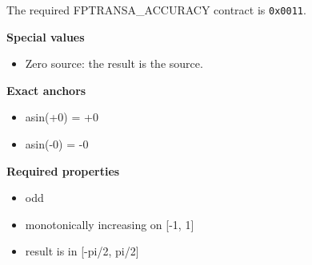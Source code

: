 The required FPTRANSA\_ACCURACY contract is \texttt{0x0011}.

\textbf{Special values}\par
\begin{itemize}
\item Zero source: the result is the source.
\end{itemize}

\textbf{Exact anchors}\par
\begin{itemize}
\item asin(+0) = +0
\item asin(-0) = -0
\end{itemize}

\textbf{Required properties}\par
\begin{itemize}
\item odd
\item monotonically increasing on [-1, 1]
\item result is in [-pi/2, pi/2]
\end{itemize}
